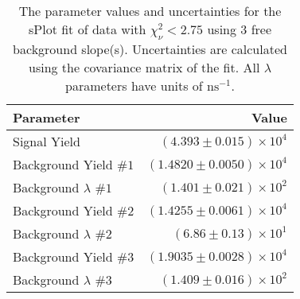 
\begin{table}
    \begin{center}
        \begin{tabular}{lr}\toprule
            Parameter & Value \\\midrule
            Signal Yield & $(4.393 \pm 0.015) \times 10^{4}$ \\
            Background Yield $\#1$ & $(1.4820 \pm 0.0050) \times 10^{4}$ \\
            Background $\lambda$ $\#1$ & $(1.401 \pm 0.021) \times 10^{2}$ \\
            Background Yield $\#2$ & $(1.4255 \pm 0.0061) \times 10^{4}$ \\
            Background $\lambda$ $\#2$ & $(6.86 \pm 0.13) \times 10^{1}$ \\
            Background Yield $\#3$ & $(1.9035 \pm 0.0028) \times 10^{4}$ \\
            Background $\lambda$ $\#3$ & $(1.409 \pm 0.016) \times 10^{2}$ \\\bottomrule
        \end{tabular}
        \caption{The parameter values and uncertainties for the sPlot fit of data with $\chi^2_\nu < 2.75$ using 3 free background slope(s). Uncertainties are calculated using the covariance matrix of the fit. All $\lambda$ parameters have units of $\si{\nano\second}^{-1}$.}
    \end{center}
\end{table}
